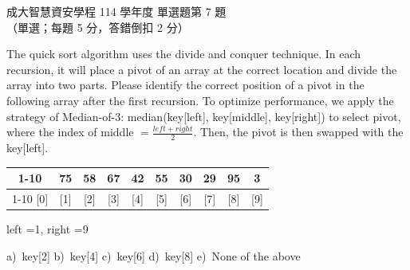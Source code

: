\begin{pastexam}[label={px:ncku-114-isec-ds-07}]{成大智慧資安學程 114 學年度 單選題第 7 題}
（單選；每題 5 分，答錯倒扣 2 分）

The quick sort algorithm uses the divide and conquer technique. In each recursion, it will place a pivot
of an array at the correct location and divide the array into two parts. Please identify the correct
position of a pivot in the following array after the first recursion. To optimize performance, we apply
the strategy of Median-of-3: median(key[left], key[middle], key[right]) to select pivot, where the index
of middle $=\frac{left+right}{2}$. Then, the pivot is then swapped with the key[left].

\begin{center}
\begin{tabular}{*{10}{c}}
\cline{1-10}
\multicolumn{1}{|c|}{-} & \multicolumn{1}{c|}{75} & \multicolumn{1}{c|}{58} & \multicolumn{1}{c|}{67} & \multicolumn{1}{c|}{42} & \multicolumn{1}{c|}{55} & \multicolumn{1}{c|}{30} & \multicolumn{1}{c|}{29} & \multicolumn{1}{c|}{95} & \multicolumn{1}{c|}{3}\\
\cline{1-10}
[0] & [1] & [2] & [3] & [4] & [5] & [6] & [7] & [8] & [9]
\end{tabular}
\qquad left =1, right =9
\end{center}

a)~key[2] \qquad b)~key[4] \qquad c)~key[6] \qquad d)~key[8] \qquad e)~None of the above
\end{pastexam}

